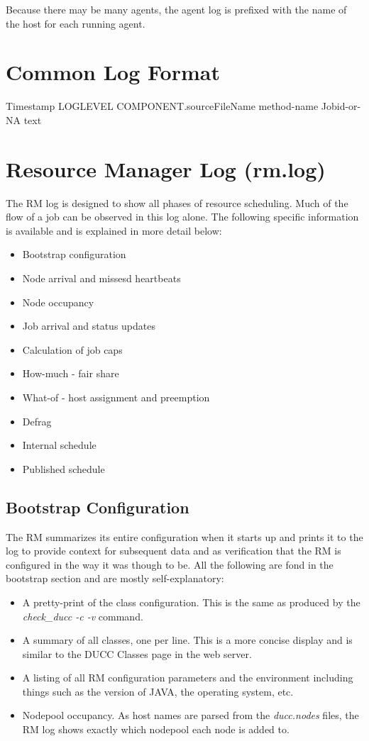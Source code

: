    Because there may be many agents, the agent log is prefixed with the name of the host for
    each running agent.

\section{Common Log Format}
     
    Timestamp   LOGLEVEL  COMPONENT.sourceFileName method-name Jobid-or-NA text

\section{Resource Manager Log (rm.log)}

    The RM log is designed to show all phases of resource scheduling.  Much of the flow of a job can
    be observed in this log alone.  The following specific information is available and is explained in
    more detail below:
    \begin{itemize}
      \item Bootstrap configuration
      \item Node arrival and missesd heartbeats
      \item Node occupancy
      \item Job arrival and status updates
      \item Calculation of job caps
      \item How-much - fair share 
      \item What-of - host assignment and preemption
      \item Defrag
      \item Internal schedule
      \item Published schedule
    \end{itemize}
    
\subsection{Bootstrap Configuration}
   The RM summarizes its entire configuration when it starts up and prints it to the log to
   provide context for subsequent data and as verification that the RM is configured in the
   way it was though to be.  All the following are fond in the bootstrap section and are mostly
   self-explanatory:

   \begin{itemize}
     \item A pretty-print of the class configuration.  This is the same as produced by the {\em check\_ducc -c -v} 
       command.
     \item A summary of all classes, one per line.  This is a more concise display and is similar to the
       DUCC Classes page in the web server.
     \item A listing of all RM configuration parameters and the environment including things such as the
       version of JAVA, the operating system, etc.
     \item Nodepool occupancy.  As host names are parsed from the {\em ducc.nodes} files, the RM log
       shows exactly which nodepool each node is added to.
   \end{itemize}
   

